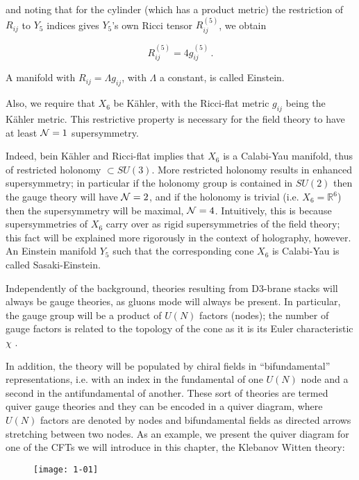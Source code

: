 and noting that for the cylinder (which has a product metric) the restriction of $R_{ij}$ to $Y_5$ indices gives $Y_5$'s own Ricci tensor $R_{ij}^{(5)}$, we obtain

\begin{equation}
	R^{(5)}_{ij} = 4 g_{ij}^{(5)}\,.
\end{equation}

A manifold with $R_{ij} = \Lambda g_{ij}$, with $\Lambda$ a constant, is called Einstein.

Also, we require that $X_6$ be K\"ahler, with the Ricci-flat metric $g_{ij}$ being the K\"ahler metric. This restrictive property is necessary \cite{KW_SCFT} for the field theory to have at least $\mathcal{N} = 1$ supersymmetry.

Indeed, bein K\"ahler and Ricci-flat implies that $X_6$ is a Calabi-Yau manifold, thus of restricted holonomy $\subset SU(3)$. More restricted holonomy results in enhanced supersymmetry; in particular if the holonomy group is contained in $SU(2)$ then the gauge theory will have $\mathcal{N} = 2$, and if the holonomy is trivial (i.e. $X_6 = \mathbb{R}^6$) then the supersymmetry will be maximal, $\mathcal{N} = 4$. Intuitively, this is because supersymmetries of $X_6$ carry over as rigid supersymmetries of the field theory; this fact will be explained more rigorously in the context of holography, however. An Einstein manifold $Y_5$ such that the corresponding cone $X_6$ is Calabi-Yau is called Sasaki-Einstein.

Independently of the background, theories resulting from D3-brane stacks will always be gauge theories, as gluons mode will always be present. In particular, the gauge group will be a product of $U(N)$ factors (nodes); the number of gauge factors is related to the topology of the cone as it is its Euler characteristic $\chi$ \cite{MZ}.

In addition, the theory will be populated by chiral fields in ``bifundamental'' representations, i.e. with an index in the fundamental of one $U(N)$ node and a second in the antifundamental of another. These sort of theories are termed quiver gauge theories and they can be encoded in a quiver diagram, where $U(N)$ factors are denoted by nodes and bifundamental fields as directed arrows stretching between two nodes. As an example, we present the quiver diagram for one of the CFTs we will introduce in this chapter, the Klebanov Witten theory:

\begin{figure}[H]
	\centering
	\texttt{[image: 1-01]}
\end{figure}

